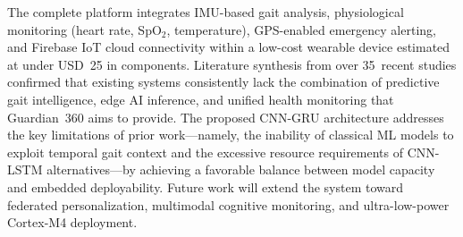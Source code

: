 \documentclass[conference]{IEEEtran}
\begin{document}
The complete platform integrates IMU-based gait analysis, physiological
monitoring (heart rate, SpO$_2$, temperature), GPS-enabled emergency
alerting, and Firebase IoT cloud connectivity within a low-cost wearable
device estimated at under USD~25 in components. Literature synthesis from
over 35~recent studies confirmed that existing systems consistently lack the
combination of predictive gait intelligence, edge AI inference, and unified
health monitoring that Guardian~360 aims to provide. The proposed
CNN-GRU architecture addresses the key limitations of prior work---namely,
the inability of classical ML models to exploit temporal gait context and
the excessive resource requirements of CNN-LSTM alternatives---by achieving
a favorable balance between model capacity and embedded deployability.
Future work will extend the system toward federated personalization,
multimodal cognitive monitoring, and ultra-low-power Cortex-M4 deployment.
\end{document}
